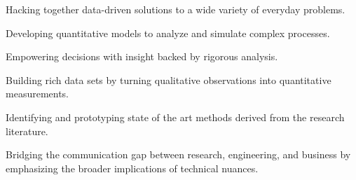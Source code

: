 



\begin{bulletsonly}{
	\vspace{4.0mm}
	\begin{cvitems}
		\item {Hacking together data-driven solutions to a wide variety of everyday problems.}		
		\item {Developing quantitative models to analyze and simulate complex processes.}
		\item {Empowering decisions with insight backed by rigorous analysis.}
		\item {Building rich data sets by turning qualitative observations into quantitative measurements.}
		\item {Identifying and prototyping state of the art methods derived from the research literature.}
		\item {Bridging the communication gap between research, engineering, and business by emphasizing the broader implications of technical nuances.}	    
	\end{cvitems}
	}
\end{bulletsonly}


